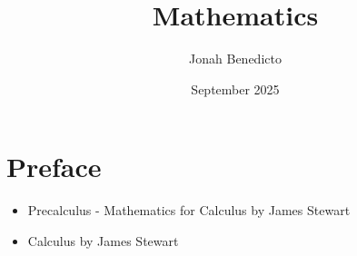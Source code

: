 \documentclass{book}
\title{Mathematics}
\author{Jonah Benedicto}
\date{September 2025}
\begin{document}
\maketitle

\tableofcontents

\chapter*{Preface}

\begin{itemize}
\item Precalculus - Mathematics for Calculus by James Stewart
\item Calculus by James Stewart
\end{itemize}


\end{document}
